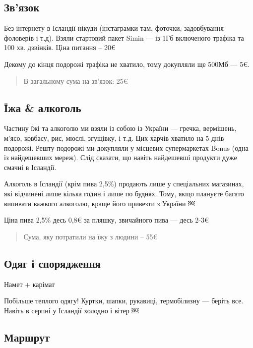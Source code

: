 \subsection{Зв'язок}

Без інтернету в Ісландії нікуди (інстаграмки там, фоточки, задовбування
фоловерів і т.д). Взяли стартовий пакет Simin --- із 1Гб включеного
трафіка та 100 хв. дзвінків. Ціна питання -- 20\euro{}

Декому до кінця подорожі трафіка не хватило, тому докупляли ще 500Мб ---
5\euro{}.

\begin{quote}
В загальному сума на зв'язок: 25\euro{}
\end{quote}

\subsection{Їжа \& алкоголь}


Частину їжі та алкоголю ми взяли із собою із України --- гречка,
вермішень, м'ясо, ковбасу, рис, мюслі, згущівку, і т.д. Цих харчів
хватило на 5 днів подорожі. Решту подорожі ми докупляли у місцевих
супермаркетах Bonus (одна із найдешевших мереж). Слід сказати, що навіть
найдешевші продукти дуже смачні в Ісландії.

Алкоголь в Ісландії (крім пива 2,5\%) продають лише у спеціальних
магазинах, які відчинені лише кілька годин і лише по буднях. Тому, якщо
плануєте багато випивати важкого алкоголю, краще його привезти з України
￼

Ціна пива 2,5\% десь 0,8\euro{} за пляшку, звичайного пива --- десь
2-3\euro{}

\begin{quote}
Сума, яку потратили на їжу з людини -- 55\euro{}
\end{quote}

\subsection{Одяг і спорядження}

Намет + карімат

Побільше теплого одягу! Куртки, шапки, рукавиці, термобілизну --- беріть
все. Навіть в серпні у Ісландії холодно і вітер ￼

\subsection{Маршрут}

